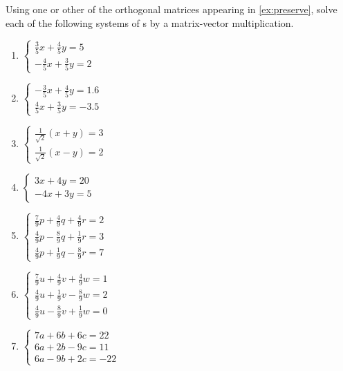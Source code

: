 \begin{exercise} \label{ex:} 
Using one or other of the orthogonal matrices appearing in \autoref{ex:preserve}, solve each of the following systems of s by a matrix-vector multiplication.
\begin{enumerate}
\item \(\begin{cases}
\frac35x+\frac45y=5
\\-\frac45x+\frac35y=2
\end{cases}\)

\item \(\begin{cases} 
-\frac35x+\frac45y=1.6
\\\frac45x+\frac35y=-3.5
\end{cases}\)

\item \(\begin{cases}
\frac1{\sqrt2}(x+y)=3
\\\frac1{\sqrt2}(x-y)=2
\end{cases}\)

\item \(\begin{cases}
3x+4y=20
\\-4x+3y=5
\end{cases}\)

\item \(\begin{cases}
\frac79p+\frac49q+\frac49r=2
\\\frac49p-\frac89q+\frac19r=3
\\\frac49p+\frac19q-\frac89r=7
\end{cases}\)

\item \(\begin{cases}
\frac79u+\frac49v+\frac49w=1
\\\frac49u+\frac19v-\frac89w=2
\\\frac49u-\frac89v+\frac19w=0
\end{cases}\)

\item \(\begin{cases}
7a+6b+6c=22
\\6a+2b-9c=11
\\6a-9b+2c=-22
\end{cases}\)


\end{enumerate}
\end{exercise}
